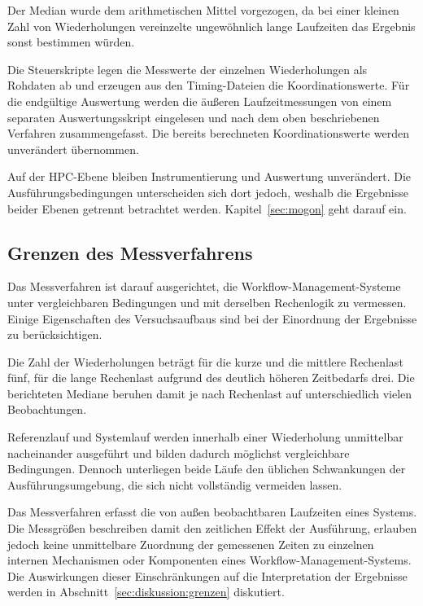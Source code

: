 Der Median wurde dem arithmetischen Mittel vorgezogen, da bei einer
kleinen Zahl von Wiederholungen vereinzelte ungewöhnlich lange
Laufzeiten das Ergebnis sonst bestimmen würden.

Die Steuerskripte legen die Messwerte der einzelnen Wiederholungen
als Rohdaten ab und erzeugen aus den Timing-Dateien die
Koordinationswerte. Für die endgültige Auswertung werden die
äußeren Laufzeitmessungen von einem separaten Auswertungsskript
eingelesen und nach dem oben beschriebenen Verfahren
zusammengefasst. Die bereits berechneten Koordinationswerte werden
unverändert übernommen.

Auf der HPC-Ebene bleiben Instrumentierung und Auswertung
unverändert. Die Ausführungsbedingungen unterscheiden sich dort
jedoch, weshalb die Ergebnisse beider Ebenen getrennt betrachtet
werden. Kapitel~\ref{sec:mogon} geht darauf ein.

\subsection{Grenzen des Messverfahrens}
\label{sec:methodik:grenzen}

\begin{sloppypar}
Das Messverfahren ist darauf ausgerichtet, die
Workflow-Management-Systeme unter vergleichbaren Bedingungen und
mit derselben Rechenlogik zu vermessen. Einige Eigenschaften des
Versuchsaufbaus sind bei der Einordnung der Ergebnisse zu
berücksichtigen.
\end{sloppypar}

Die Zahl der Wiederholungen beträgt für die kurze und die mittlere
Rechenlast fünf, für die lange Rechenlast aufgrund des deutlich
höheren Zeitbedarfs drei. Die berichteten Mediane beruhen damit je
nach Rechenlast auf unterschiedlich vielen Beobachtungen.

Referenzlauf und Systemlauf werden innerhalb einer Wiederholung
unmittelbar nacheinander ausgeführt und bilden dadurch möglichst
vergleichbare Bedingungen. Dennoch unterliegen beide Läufe den
üblichen Schwankungen der Ausführungsumgebung, die sich nicht
vollständig vermeiden lassen.

Das Messverfahren erfasst die von außen beobachtbaren Laufzeiten
eines Systems. Die Messgrößen beschreiben damit den zeitlichen
Effekt der Ausführung, erlauben jedoch keine unmittelbare Zuordnung
der gemessenen Zeiten zu einzelnen internen Mechanismen oder
Komponenten eines Workflow-Management-Systems. Die Auswirkungen
dieser Einschränkungen auf die Interpretation der Ergebnisse werden
in Abschnitt~\ref{sec:diskussion:grenzen} diskutiert.
